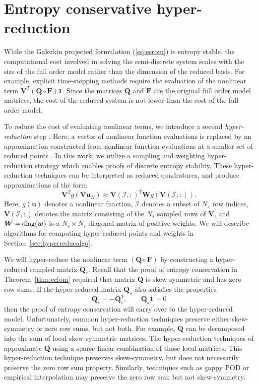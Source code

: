\documentclass[review]{siamart171218}
\theoremstyle{assumption}
\newcommand{\LRp}[1]{\left( #1 \right)}
\begin{document}
\section{Entropy conservative hyper-reduction}
\label{sec:4}
While the Galerkin projected formulation (\ref{eq:esrom}) is entropy stable, the computational cost involved in solving the semi-discrete system scales with the size of the full order model rather than the dimension of the reduced basis.  For example, explicit time-stepping methods require the evaluation of the nonlinear term $\bm{V}^T\LRp{\bm{Q} \circ \bm{F}}\bm{1}$.  Since the matrices $\bm{Q}$ and $\bm{F}$ are the original full order model matrices, the cost of the reduced system is not lower than the cost of the full order model.  

To reduce the cost of evaluating nonlinear terms, we introduce a second \textit{hyper-reduction} step \cite{ryckelynck2009hyper}.  Here, a vector of nonlinear function evaluations is replaced by an approximation constructed from nonlinear function evaluations at a smaller set of reduced points \cite{barrault2004empirical, bui2004aerodynamic, chaturantabut2010nonlinear, farhat2015structure, drmac2016new, hernandez2017dimensional, yano2019lp}.  In this work, we utilize a sampling and weighting hyper-reduction strategy \cite{farhat2015structure, hernandez2017dimensional, yano2019lp} which enables proofs of discrete entropy stability.  These hyper-reduction techniques can be interpreted as reduced quadratures, and produce approximations of the form
\[
\bm{V}^Tg(\bm{V}\bm{u}_N) \approx \bm{V}\LRp{\mathcal{I},:}^T \bm{W} g\LRp{\bm{V}\LRp{\mathcal{I},:}}.
\]
Here, $g(\bm{u})$ denotes a nonlinear function, $\mathcal{I}$ denotes a subset of $N_s$ row indices, $\bm{V}\LRp{\mathcal{I},:}$ denotes the matrix consisting of the $N_s$ sampled rows of $\bm{V}$, and $\bm{W} = {\rm diag}(\bm{w})$ is a $N_s\times N_s$ diagonal matrix of positive weights.  We will describe algorithms for computing hyper-reduced points and weights in Section~\ref{sec:hyperreducalgo}.

We will hyper-reduce the nonlinear term $\LRp{\bm{Q}\circ \bm{F}}$ by constructing a hyper-reduced sampled matrix $\bm{Q}_s$.  Recall that the proof of entropy conservation in Theorem~\ref{thm:ecfom} required that matrix $\bm{Q}$ is skew symmetric and has zero row sums.  If the hyper-reduced matrix $\bm{Q}_s$ also satisfies the properties
\[
\bm{Q}_s = -\bm{Q}_s^T, \qquad \bm{Q}_s\bm{1} = 0
\]
then the proof of entropy conservation will carry over to the hyper-reduced model.  Unfortunately, common hyper-reduction techniques preserve either skew-symmetry or zero row sums, but not both.  For example, $\bm{Q}$ can be decomposed into the sum of local skew-symmetric matrices.  The hyper-reduction techniques of \cite{farhat2015structure, yano2019discontinuous} approximate $\bm{Q}$ using a sparse linear combination of those local matrices.  This hyper-reduction technique preserves skew-symmetry, but does not necessarily preserve the zero row sum property.  Similarly, techniques such as gappy POD or empirical interpolation \cite{everson1995karhunen, barrault2004empirical, chaturantabut2010nonlinear} may preserve the zero row sum but not skew-symmetry.  
\end{document}
